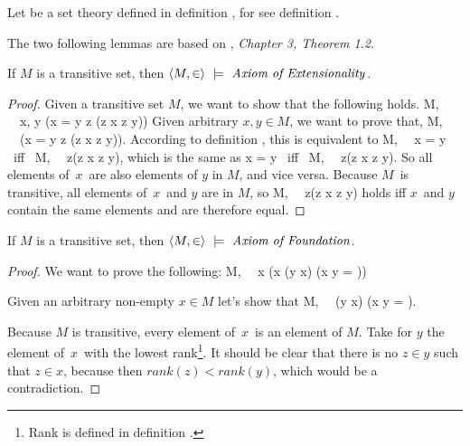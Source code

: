 Let  be a set theory defined in definition , for  see definition .


The two following lemmas are based on \cite{DrakeBook}, \emph{Chapter 3, Theorem 1.2}.
\begin{lemma}\label{lemma:extensionality_in_transitive} %
If $M$ is a transitive set, then $\langle M, \in \rangle~\models~\mbox{\emph{Axiom of Extensionality}}$.
\end{lemma}

\begin{proof}
Given a transitive set $M$, we want to show that the following holds.
\beq
\langle M, \in \rangle~\models~\forall x, y (x = y \iff \forall z (z \in x \iff z \in y))
\eeq 
Given arbitrary $x, y \in M$, we want to prove that, 
\beq
\langle M, \in \rangle~\models~(x = y \iff \forall z (z \in x \iff z \in y))\mbox{.}
\eeq
According to definition , this is equivalent to
\beq
\langle M, \in \rangle~\models~x = y \mbox{ iff } \langle M, \in \rangle~\models~\forall z(z \in x \iff z \in y)\mbox{,}
\eeq 
which is the same as
\beq
x = y \mbox{ iff } \langle M, \in \rangle~\models~\forall z(z \in x \iff z \in y)\mbox{.}
\eeq
So all elements of~$x$~are also elements of $y$ in $M$, and vice versa. 
Because $M$ is transitive, all elements of~$x$~and $y$ are in $M$, 
so
\beq \langle M, \in \rangle~\models~\forall z(z \in x \iff z \in y)
\eeq
holds iff $x$ and $y$ contain the same elements and are therefore equal.
\end{proof}

\begin{lemma}\label{lemma:foundation_in_transitive}
If $M$ is a transitive set, then $\langle M, \in \rangle~\models~\mbox{\emph{Axiom of Foundation}}$.
\end{lemma}

\begin{proof}
We want to prove the following:
\beq
\langle M, \in \rangle~\models~\forall x (x \neq \emptyset \then (\exists y \in x) (x \cap y = \emptyset))
\eeq

Given an arbitrary non-empty $x \in M$ let's show that
\beq
\langle M, \in \rangle~\models~(\exists y \in x) (x \cap y = \emptyset)\mbox{.}
\eeq

Because $M$ is transitive, every element of~$x$~is an element of $M$. Take for $y$ the element of~$x$~with the lowest rank\footnote{Rank is defined in definition .}. It should be clear that there is no $z \in y$ such that $z \in x$, because then $rank(z) < rank(y)$, which would be a contradiction.
\end{proof}

